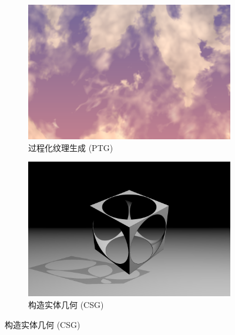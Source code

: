 {\begin{figure}[htbp]
  \centering
  \begin{minipage}[b]{\textwidth}
      \begin{subfigure}[b]{0.48\textwidth}
          \includegraphics[width=\textwidth]{figures/shadertoy_cloud.png}
          \caption{过程化纹理生成 (PTG)}
          \label{fig:sub_textgen}
      \end{subfigure}
      \hfill %
      \begin{subfigure}[b]{0.48\textwidth}
          \includegraphics[width=\textwidth]{figures/shadertoy_csg.png}
          \caption{构造实体几何 (CSG)}
          \label{fig:sub_csg}
      \end{subfigure}
  \end{minipage}
  
  

\end{figure}}
